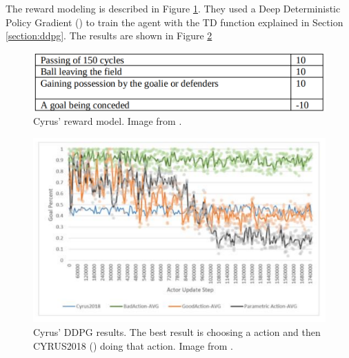 The reward modeling is described in Figure \ref{fig:cyrus_rewards}. They used a Deep Deterministic Policy Gradient (\cite{DDPG}) to train the agent with the TD function explained in Section \ref{section:ddpg}. The results are shown in Figure \ref{fig:cyrus_results}
\begin{figure}[H]
    \centering
    \includegraphics[scale=0.5]{images/cyrus_rewards.png}
    \caption{Cyrus' reward model. Image from \cite{cyrus}.}
    \label{fig:cyrus_rewards}
\end{figure}

\begin{figure}[H]
    \centering
    \includegraphics[scale=0.5]{images/cyrus_results.png}
    \caption{Cyrus' DDPG results. The best result is choosing a action and then CYRUS2018 (\cite{cyrus2018}) doing that action. Image from \cite{cyrus}.}
    \label{fig:cyrus_results}
\end{figure}